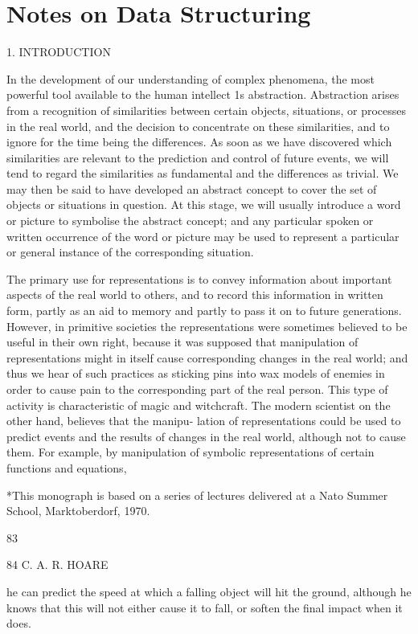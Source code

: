 \chapter{Notes on Data Structuring}

1. INTRODUCTION

In the development of our understanding of complex phenomena, the most powerful tool available to the human intellect 1s abstraction. Abstraction arises from a recognition of similarities between certain objects, situations, or processes in the real world, and the decision to concentrate on these similarities, and to ignore for the time being the differences. As soon as we have discovered which similarities are relevant to the prediction and control of future events, we will tend to regard the similarities as fundamental and the differences as trivial. We may then be said to have developed an abstract concept to cover the set of objects or situations in question. At this stage, we will usually introduce a word or picture to symbolise the abstract concept; and any particular spoken or written occurrence of the word or picture may be used to represent a particular or general instance of the corresponding situation.

The primary use for representations is to convey information about important aspects of the real world to others, and to record this information in written form, partly as an aid to memory and partly to pass it on to future generations. However, in primitive societies the representations were sometimes believed to be useful in their own right, because it was supposed that manipulation of representations might in itself cause corresponding changes in the real world; and thus we hear of such practices as sticking pins into wax models of enemies in order to cause pain to the corresponding part of the real person. This type of activity is characteristic of magic and witchcraft. The modern scientist on the other hand, believes that the manipu- lation of representations could be used to predict events and the results of changes in the real world, although not to cause them. For example, by manipulation of symbolic representations of certain functions and equations,

*This monograph is based on a series of lectures delivered at a Nato Summer School, Marktoberdorf, 1970.

83

84 C. A. R. HOARE

he can predict the speed at which a falling object will hit the ground, although he knows that this will not either cause it to fall, or soften the final impact when it does.

